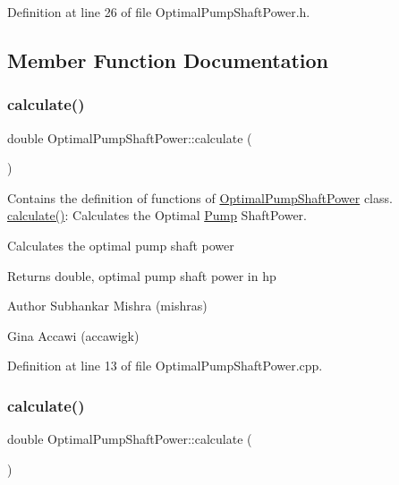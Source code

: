 Definition at line 26 of file Optimal\+Pump\+Shaft\+Power.\+h.



\subsection{Member Function Documentation}
\mbox{\label{class_optimal_pump_shaft_power_a23ab040eea0a9e0431988bd353076237}} 
\subsubsection{\texorpdfstring{calculate()}{calculate()}\hspace{0.1cm}{\footnotesize\ttfamily [1/3]}}
{\footnotesize\ttfamily double Optimal\+Pump\+Shaft\+Power\+::calculate (\begin{DoxyParamCaption}{ }\end{DoxyParamCaption})}



Contains the definition of functions of \hyperlink{class_optimal_pump_shaft_power}{Optimal\+Pump\+Shaft\+Power} class. \hyperlink{class_optimal_pump_shaft_power_a23ab040eea0a9e0431988bd353076237}{calculate()}\+: Calculates the Optimal \hyperlink{class_pump}{Pump} Shaft\+Power. 

Calculates the optimal pump shaft power

\begin{DoxyReturn}{Returns}
double, optimal pump shaft power in hp
\end{DoxyReturn}
\begin{DoxyAuthor}{Author}
Subhankar Mishra (mishras) 

Gina Accawi (accawigk) 
\end{DoxyAuthor}


Definition at line 13 of file Optimal\+Pump\+Shaft\+Power.\+cpp.

\mbox{\label{class_optimal_pump_shaft_power_a23ab040eea0a9e0431988bd353076237}} 
\subsubsection{\texorpdfstring{calculate()}{calculate()}\hspace{0.1cm}{\footnotesize\ttfamily [2/3]}}
{\footnotesize\ttfamily double Optimal\+Pump\+Shaft\+Power\+::calculate (\begin{DoxyParamCaption}{ }\end{DoxyParamCaption})}

